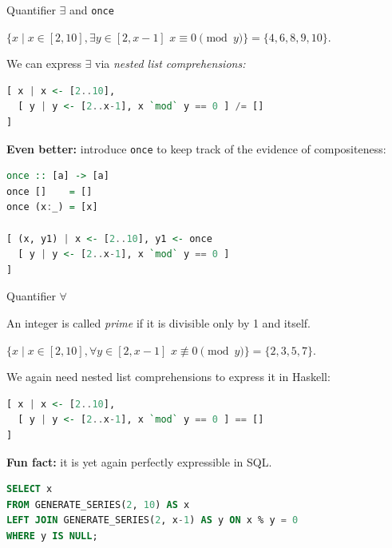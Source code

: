 \documentclass[handout]{beamer}
\begin{document}
\begin{frame}[fragile]{Quantifier $\exists$ and {\tt once}}

$ \{ x \mid x \in [2, 10], \exists y \in [2, x-1] \,\, x \equiv 0 \pmod y \} =
\{ 4,6,8,9,10 \}$.

\bigskip

We can express $\exists$ via {\em nested list comprehensions:}

\begin{lstlisting}[language=Haskell]
[ x | x <- [2..10],
  [ y | y <- [2..x-1], x `mod` y == 0 ] /= []
]
\end{lstlisting}

\pause

{\bf Even better:} introduce {\tt once} to keep track of the evidence of compositeness:

\begin{lstlisting}[language=Haskell]
once :: [a] -> [a]
once []    = []
once (x:_) = [x]

[ (x, y1) | x <- [2..10], y1 <- once
  [ y | y <- [2..x-1], x `mod` y == 0 ]
]
\end{lstlisting}


\end{frame}

\begin{frame}[fragile]{Quantifier $\forall$}

An integer is called {\em prime} if it is divisible only by 1 and itself.

\bigskip

$ \{ x \mid x \in [2, 10], \forall y \in [2, x-1] \,\, x \not\equiv 0 \pmod y \} =
\{ 2,3,5,7 \}$.

\bigskip

\pause

We again need nested list comprehensions to express it in Haskell:
\begin{lstlisting}[language=Haskell]
[ x | x <- [2..10],
  [ y | y <- [2..x-1], x `mod` y == 0 ] == []
]
\end{lstlisting}

\pause

{\bf Fun fact:} it is yet again perfectly expressible in SQL.
\begin{lstlisting}[language=SQL]
SELECT x
FROM GENERATE_SERIES(2, 10) AS x
LEFT JOIN GENERATE_SERIES(2, x-1) AS y ON x % y = 0
WHERE y IS NULL;
\end{lstlisting}

\end{frame}
\end{document}
